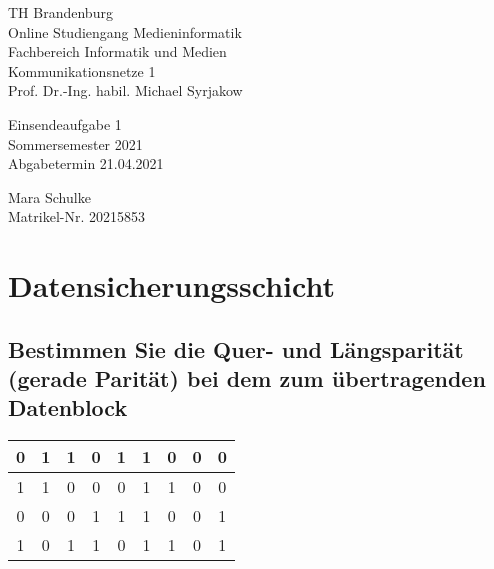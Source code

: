 \documentclass{article}
\begin{document}
\begin{titlepage}
	\begin{flushleft}
		TH Brandenburg \\
		Online Studiengang Medieninformatik \\
		Fachbereich Informatik und Medien \\
		Kommunikationsnetze 1 \\
		Prof. Dr.-Ing. habil. Michael Syrjakow
	\end{flushleft}

	\vfill

	\begin{center}
		\Large{Einsendeaufgabe 1}\\[0.5em]
		\large{Sommersemester 2021}\\[0.25em]
		\large{Abgabetermin 21.04.2021}
	\end{center}

	\vfill

	\begin{flushright}
		Mara Schulke \\
		Matrikel-Nr. 20215853
	\end{flushright}
\end{titlepage}

\newpage

\section{Datensicherungsschicht}

\subsection{Bestimmen Sie die Quer- und Längsparität (gerade Parität) bei dem zum übertragenden Datenblock}

\begin{center}
	\begin{tabular}{|c|c|c|c|c|c|c|c|c|}
		\hline
		0                    & 1                    & 1                    & 0                    & 1                    & 1                    & 0                    & 0                    & \cellcolor{gray!25}0 \\
		\hline
		1                    & 1                    & 0                    & 0                    & 0                    & 1                    & 1                    & 0                    & \cellcolor{gray!25}0 \\
		\hline
		0                    & 0                    & 0                    & 1                    & 1                    & 1                    & 0                    & 0                    & \cellcolor{gray!25}1 \\
		\hline
		\cellcolor{gray!25}1 & \cellcolor{gray!25}0 & \cellcolor{gray!25}1 & \cellcolor{gray!25}1 & \cellcolor{gray!25}0 & \cellcolor{gray!25}1 & \cellcolor{gray!25}1 & \cellcolor{gray!25}0 & \cellcolor{gray!25}1 \\
		\hline
	\end{tabular}
\end{center}
\end{document}
